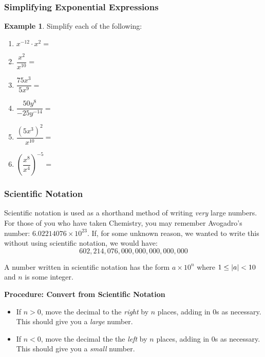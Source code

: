 \documentclass[addpoints,12pt]{exam}
\theoremstyle{definition}
\theoremstyle{break}
\theoremstyle{break}
\newtheorem{example}{Example}[subsection]
\begin{document}
\newpage

\subsubsection*{Simplifying Exponential Expressions}
\begin{example}
Simplify each of the following:
\begin{enumerate}
\item $x^{-12}\cdot x^2 = $
\vspace{.25in}
\item $\dfrac{x^2}{x^{10}} = $
\vspace{.25in}
\item $\dfrac{75x^3}{5x^9} = $
\vspace{.25in}
\item $\dfrac{50y^8}{-25y^{-14}} = $
\vspace{.25in}
\item $\dfrac{(5x^3)^2}{x^{10}} = $
\vspace{.35in}
\item $\left(\dfrac{x^8}{x^4}\right)^{-5} = $
\end{enumerate}
\end{example}

\newpage

\subsubsection*{Scientific Notation}
Scientific notation is used as a shorthand method of writing \emph{very} large numbers. For those of you who have taken Chemistry, you may remember Avogadro's number: $6.02214076\times 10^{23}$. If, for some unknown reason, we wanted to write this without using scientific notation, we would have:
\[602,214,076,000,000,000,000,000\]

\vspace{.15in}

\begin{definition}
A number written in scientific notation has the form $a \times 10^n$ where $1 \le \abs{a} < 10$ and $n$ is some integer.
\end{definition}
\vspace{.15in}

\begin{mdframed}
\textbf{Procedure: Convert from Scientific Notation}
\begin{itemize}
\item If $n > 0$, move the decimal to the \emph{right} by $n$ places, adding in 0s as necessary. This should give you a \emph{large} number.
\item If $n < 0$, move the decimal the the \emph{left} by $n$ places, adding in 0s as necessary. This should give you a \emph{small} number.
\end{itemize}
\end{mdframed}
\vspace{.15in}
\end{document}

